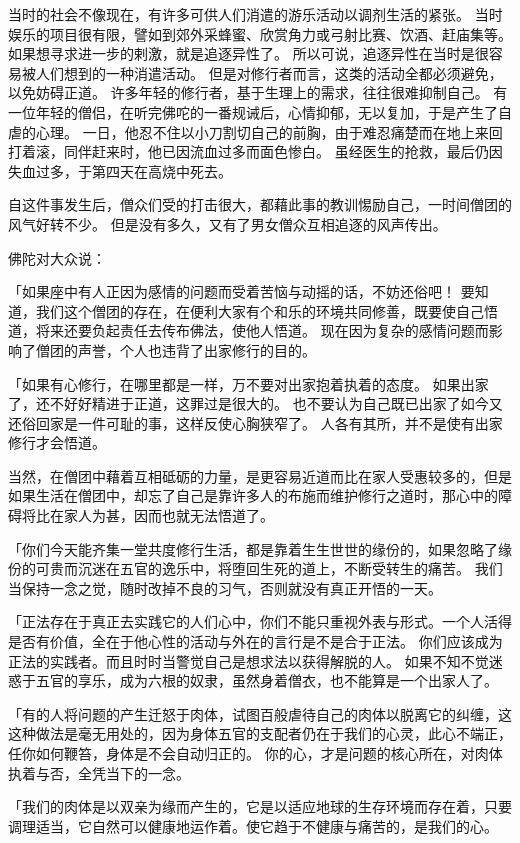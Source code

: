 \documentclass[twoside,openany]{book}
\begin{document}
当时的社会不像现在，有许多可供人们消遣的游乐活动以调剂生活的紧张。
当时娱乐的项目很有限，譬如到郊外采蜂蜜、欣赏角力或弓射比赛、饮酒、赶庙集等。
如果想寻求进一步的剌激，就是追逐异性了。
所以可说，追逐异性在当时是很容易被人们想到的一种消遣活动。
但是对修行者而言，这类的活动全都必须避免，以免妨碍正道。
许多年轻的修行者，基于生理上的需求，往往很难抑制自己。
有一位年轻的僧侣，在听完佛咜的一番规诫后，心情抑郁，无以复加，于是产生了自虐的心理。
一日，他忍不住以小刀割切自己的前胸，由于难忍痛楚而在地上来回打着滚，同伴赶来时，他已因流血过多而面色惨白。
虽经医生的抢救，最后仍因失血过多，于第四天在高烧中死去。

自这件事发生后，僧众们受的打击很大，都藉此事的教训惕励自己，一时间僧团的风气好转不少。
但是没有多久，又有了男女僧众互相追逐的风声传出。

佛陀对大众说：

「如果座中有人正因为感情的问题而受着苦恼与动摇的话，不妨还俗吧！
要知道，我们这个僧团的存在，在便利大家有个和乐的环境共同修善，既要使自己悟道，将来还要负起责任去传布佛法，使他人悟道。
现在因为复杂的感情问题而影响了僧团的声誉，个人也违背了出家修行的目的。

「如果有心修行，在哪里都是一样，万不要对出家抱着执着的态度。
如果出家了，还不好好精进于正道，这罪过是很大的。
也不要认为自己既已出家了如今又还俗回家是一件可耻的事，这样反使心胸狭窄了。
人各有其所，并不是使有出家修行才会悟道。

当然，在僧团中藉着互相砥砺的力量，是更容易近道而比在家人受惠较多的，但是如果生活在僧团中，却忘了自己是靠许多人的布施而维护修行之道时，那心中的障碍将比在家人为甚，因而也就无法悟道了。

「你们今天能齐集一堂共度修行生活，都是靠着生生世世的缘份的，如果忽略了缘份的可贵而沉迷在五官的逸乐中，将堕回生死的道上，不断受转生的痛苦。
我们当保持一念之觉，随时改掉不良的习气，否则就没有真正开悟的一天。

「正法存在于真正去实践它的人们心中，你们不能只重视外表与形式。一个人活得是否有价值，全在于他心性的活动与外在的言行是不是合于正法。
你们应该成为正法的实践者。而且时时当警觉自己是想求法以获得解脱的人。
如果不知不觉迷惑于五官的享乐，成为六根的奴隶，虽然身着僧衣，也不能算是一个出家人了。

「有的人将问题的产生迁怒于肉体，试图百般虐待自己的肉体以脱离它的纠缠，这这种做法是毫无用处的，因为身体五官的支配者仍在于我们的心灵，此心不端正，任你如何鞭笞，身体是不会自动归正的。
你的心，才是问题的核心所在，对肉体执着与否，全凭当下的一念。

「我们的肉体是以双亲为缘而产生的，它是以适应地球的生存环境而存在着，只要调理适当，它自然可以健康地运作着。使它趋于不健康与痛苦的，是我们的心。
\end{document}
